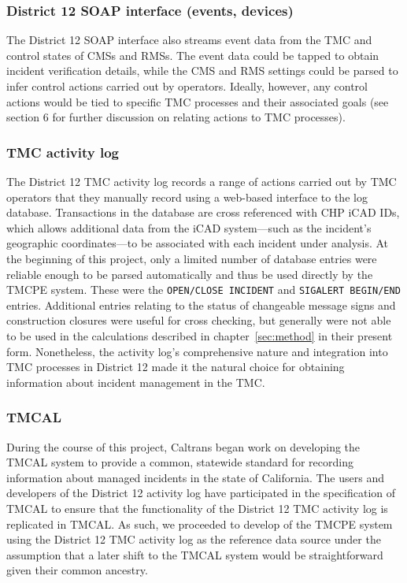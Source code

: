 \documentclass[12pt]{report}
\begin{document}
\subsubsection{District 12 SOAP interface (events, devices)}
\label{sec:d12-soap-interface}

The District 12 SOAP interface also streams event data from the \ac{TMC} and
control states of \acp{CMS} and \acp{RMS}.  The event data could be
tapped to obtain incident verification details, while the \ac{CMS} and
\ac{RMS} settings could be parsed to infer control actions carried out
by operators.  Ideally, however, any control actions would be tied to
specific \ac{TMC} processes and their associated goals (see section 6
for further discussion on relating actions to \ac{TMC} processes).

\subsubsection{TMC activity log}
\label{sec:tmc-activity-log}

The District 12 \ac{TMC} activity log records a range of actions carried
out by \ac{TMC} operators that they manually record using a web-based
interface to the log database.  Transactions in the database are cross
referenced with \ac{CHP} \ac{iCAD} IDs, which allows additional data
from the \ac{iCAD} system---such as the incident's geographic
coordinates---to be associated with each incident under analysis.  At
the beginning of this project, only a limited number of database
entries were reliable enough to be parsed automatically and thus be
used directly by the \ac{TMCPE} system.  These were the
\texttt{OPEN/CLOSE INCIDENT} and \texttt{SIGALERT BEGIN/END} entries.
Additional entries relating to the status of changeable message signs
and construction closures were useful for cross checking, but
generally were not able to be used in the calculations described in
chapter~\ref{sec:method} in their present form.  Nonetheless, the
activity log's comprehensive nature and integration into \ac{TMC}
processes in District 12 made it the natural choice for obtaining
information about incident management in the \ac{TMC}.


\subsubsection{TMCAL}
\label{sec:tmcal}

During the course of this project, Caltrans began work on developing
the \ac{TMCAL} system to provide a common, statewide standard for
recording information about managed incidents in the state of
California.  The users and developers of the District 12 activity log
have participated in the specification of \ac{TMCAL} to ensure that
the functionality of the District 12 \ac{TMC} activity log is
replicated in TMCAL.  As such, we proceeded to develop of the
\ac{TMCPE} system using the District 12 \ac{TMC} activity log as the
reference data source under the assumption that a later shift to the
\ac{TMCAL} system would be straightforward given their common
ancestry.
\end{document}
